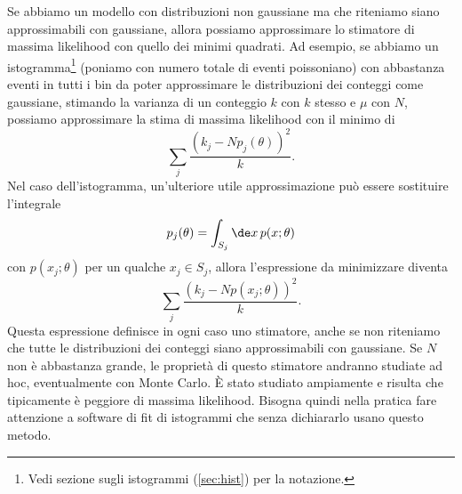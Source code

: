 Se abbiamo un modello con distribuzioni non gaussiane ma che riteniamo siano approssimabili con gaussiane,
allora possiamo approssimare lo stimatore di massima likelihood con quello dei minimi quadrati.
Ad esempio, se abbiamo un istogramma\footnote{Vedi sezione sugli istogrammi (\ref{sec:hist}) per la notazione.}
(poniamo con numero totale di eventi poissoniano)
con abbastanza eventi in tutti i bin da poter approssimare le distribuzioni dei conteggi come gaussiane,
stimando la varianza di un conteggio $k$ con $k$ stesso e $\mu$ con $N$,
possiamo approssimare la stima di massima likelihood con il minimo di
\begin{equation*}
	\sum_j \frac{(k_j - Np_j(\theta))^2}{k}.
\end{equation*}
Nel caso dell'istogramma, un'ulteriore utile approssimazione può essere sostituire l'integrale
\begin{equation*}
	p_j(\theta) = \int_{S_j} \de x\, p(x;\theta)
\end{equation*}
con $p(x_j;\theta)$ per un qualche $x_j\in S_j$, allora l'espressione da minimizzare diventa
\begin{equation*}
	\sum_j \frac{(k_j - Np(x_j;\theta))^2}{k}.
\end{equation*}
Questa espressione definisce in ogni caso uno stimatore,
anche se non riteniamo che tutte le distribuzioni dei conteggi siano approssimabili con gaussiane.
Se $N$ non è abbastanza grande, le proprietà di questo stimatore andranno studiate ad hoc,
eventualmente con Monte Carlo.
È stato studiato ampiamente e risulta che tipicamente è peggiore di massima likelihood.
Bisogna quindi nella pratica fare attenzione a software di fit di istogrammi che senza dichiararlo usano questo metodo.

